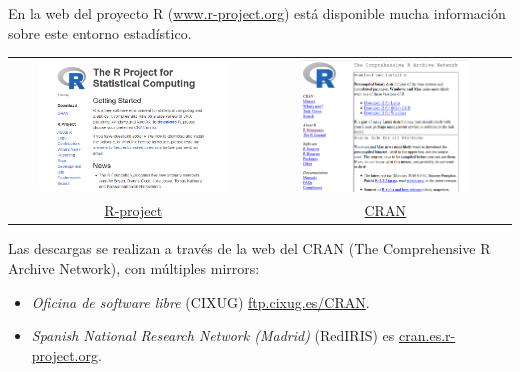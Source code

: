 \documentclass[]{book}
\providecommand{\tightlist}{%
  \setlength{\itemsep}{0pt}\setlength{\parskip}{0pt}}
\begin{document}
En la web del proyecto R
(\href{http://www.r-project.org}{www.r-project.org}) está disponible
mucha información sobre este entorno estadístico.

\begin{longtable}[]{@{}cc@{}}
\toprule
\includegraphics[width=0.80000\textwidth]{figuras/rproject.png} &
\includegraphics[width=0.70000\textwidth]{figuras/cran.png}\tabularnewline
\href{https://r-project.org}{R-project} &
\href{https://cran.r-project.org}{CRAN}\tabularnewline
\bottomrule
\end{longtable}

Las descargas se realizan a través de la web del CRAN (The Comprehensive
R Archive Network), con múltiples mirrors:

\begin{itemize}
\tightlist
\item
  \emph{Oficina de software libre} (CIXUG)
  \href{http://ftp.cixug.es/CRAN/}{ftp.cixug.es/CRAN}.
\item
  \emph{Spanish National Research Network (Madrid)} (RedIRIS) es
  \href{http://cran.es.r-project.org/}{cran.es.r-project.org}.
\end{itemize}
\end{document}
